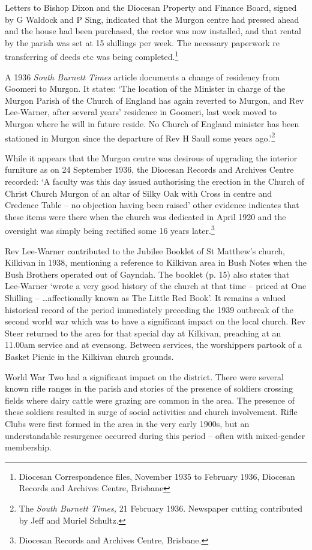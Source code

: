 Letters to Bishop Dixon and the Diocesan Property and Finance Board, signed by G Waldock and P Sing, indicated that the Murgon centre had pressed ahead and the house had been purchased, the rector was now installed, and that rental by the parish was set at 15 shillings per week. The necessary paperwork re transferring of deeds etc was being completed.\footnote{Diocesan Correspondence files, November 1935 to February 1936, Diocesan Records and Archives Centre, Brisbane}

A 1936 \emph{South Burnett Times} article documents a change of residency from Goomeri to Murgon. It states: `The location of the Minister in charge of the Murgon Parish of the Church of England has again reverted to Murgon, and Rev Lee-Warner, after several years' residence in Goomeri, last week moved to Murgon where he will in future reside. No Church of England minister has been stationed in Murgon since the departure of Rev H Saull some years ago.'\footnote{The \emph{South Burnett Times,} 21 February 1936. Newspaper cutting contributed by Jeff and Muriel Schultz.}

While it appears that the Murgon centre was desirous of upgrading the interior furniture as on 24 September 1936, the Diocesan Records and Archives Centre recorded: `A faculty was this day issued authorising the erection in the Church of Christ Church Murgon of an altar of Silky Oak with Cross in centre and Credence Table -- no objection having been raised' other evidence indicates that these items were there when the church was dedicated in April 1920 and the oversight was simply being rectified some 16 years later.\footnote{Diocesan Records and Archives Centre, Brisbane.}

Rev Lee-Warner contributed to the Jubilee Booklet of St Matthew's church, Kilkivan in 1938, mentioning a reference to Kilkivan area in Bush Notes when the Bush Brothers operated out of Gayndah. The booklet (p. 15) also states that Lee-Warner `wrote a very good history of the church at that time -- priced at One Shilling -- \ldots affectionally known as The Little Red Book'. It remains a valued historical record of the period immediately preceding the 1939 outbreak of the second world war which was to have a significant impact on the local church. Rev Steer returned to the area for that special day at Kilkivan, preaching at an 11.00am service and at evensong. Between services, the worshippers partook of a Basket Picnic in the Kilkivan church grounds.

World War Two had a significant impact on the district. There were several known rifle ranges in the parish and stories of the presence of soldiers crossing fields where dairy cattle were grazing are common in the area. The presence of these soldiers resulted in surge of social activities and church involvement. Rifle Clubs were first formed in the area in the very early 1900s, but an understandable resurgence occurred during this period -- often with mixed-gender membership.

